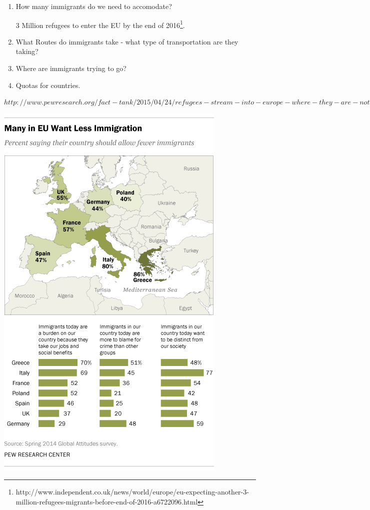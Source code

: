 \documentclass{article}
\begin{document}
\begin{enumerate}
    \item How many immigrants do we need to accomodate?

    3 Million refugees to enter the EU by the end of 2016\footnote{http://www.independent.co.uk/news/world/europe/eu-expecting-another-3-million-refugees-migrants-before-end-of-2016-a6722096.html}.

    \item What Routes do immigrants take - what type of transportation are they taking?

    \item Where are immigrants trying to go?

    \item Quotas for countries.
\end{enumerate}

$http://www.pewresearch.org/fact-tank/2015/04/24/refugees-stream-into-europe-where-they-are-not-welcomed-with-open-arms/ft_15-04-22_eu-immigration/$



\begin{center}
\includegraphics[scale=0.5]{ImmigrationPoll}
\end{center}
\end{document}
